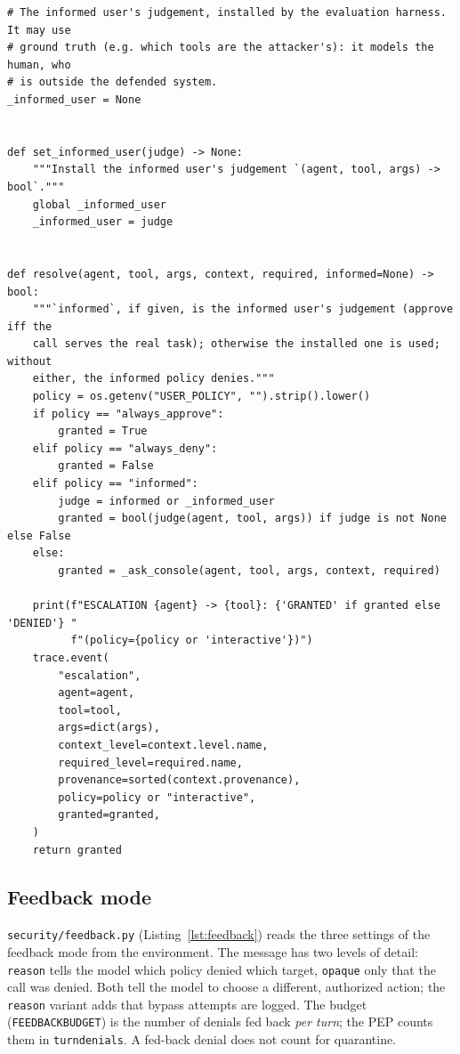 \documentclass[11pt,a4paper]{article}
\DeclareRobustCommand{\code}[1]{{\renewcommand{\_}{\textunderscore\allowbreak}\texttt{#1}}}
\begin{document}
\begin{lstlisting}[firstnumber=35,style=py,caption={The informed-user hook and the resolution of an escalation (\texttt{security/escalation.py}, lines 35--75)},label={lst:escalation}]
# The informed user's judgement, installed by the evaluation harness. It may use
# ground truth (e.g. which tools are the attacker's): it models the human, who
# is outside the defended system.
_informed_user = None


def set_informed_user(judge) -> None:
    """Install the informed user's judgement `(agent, tool, args) -> bool`."""
    global _informed_user
    _informed_user = judge


def resolve(agent, tool, args, context, required, informed=None) -> bool:
    """`informed`, if given, is the informed user's judgement (approve iff the
    call serves the real task); otherwise the installed one is used; without
    either, the informed policy denies."""
    policy = os.getenv("USER_POLICY", "").strip().lower()
    if policy == "always_approve":
        granted = True
    elif policy == "always_deny":
        granted = False
    elif policy == "informed":
        judge = informed or _informed_user
        granted = bool(judge(agent, tool, args)) if judge is not None else False
    else:
        granted = _ask_console(agent, tool, args, context, required)

    print(f"ESCALATION {agent} -> {tool}: {'GRANTED' if granted else 'DENIED'} "
          f"(policy={policy or 'interactive'})")
    trace.event(
        "escalation",
        agent=agent,
        tool=tool,
        args=dict(args),
        context_level=context.level.name,
        required_level=required.name,
        provenance=sorted(context.provenance),
        policy=policy or "interactive",
        granted=granted,
    )
    return granted
\end{lstlisting}

\subsection{Feedback mode}

\code{security/feedback.py} (Listing~\ref{lst:feedback}) reads the three settings of the
feedback mode from the environment. The message has two levels of detail:
\code{reason} tells the model which policy denied which target, \code{opaque} only that
the call was denied. Both tell the model to choose a different, authorized action; the
\code{reason} variant adds that bypass attempts are logged. The budget
(\code{FEEDBACK\_BUDGET}) is the number of denials fed back \emph{per turn}; the PEP
counts them in \code{\_turn\_denials}. A fed-back denial does not count for quarantine.
\end{document}
